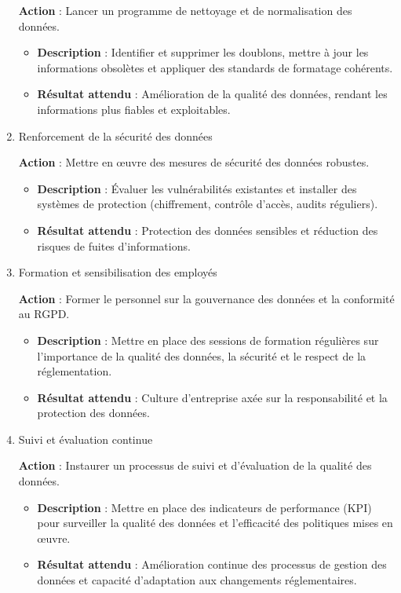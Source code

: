 \begin{enumerate}
        \textbf{Action} : Lancer un programme de nettoyage et de normalisation des données.

        \begin{itemize}
            \item \textbf{Description} : Identifier et supprimer les doublons, mettre à jour les informations obsolètes et appliquer des standards de formatage cohérents.
            \item \textbf{Résultat attendu} : Amélioration de la qualité des données, rendant les informations plus fiables et exploitables.
        \end{itemize}

    \item Renforcement de la sécurité des données

        \textbf{Action} : Mettre en œuvre des mesures de sécurité des données robustes.

        \begin{itemize}
            \item \textbf{Description} : Évaluer les vulnérabilités existantes et installer des systèmes de protection (chiffrement, contrôle d'accès, audits réguliers).
            \item \textbf{Résultat attendu} : Protection des données sensibles et réduction des risques de fuites d’informations.
        \end{itemize}

    \item Formation et sensibilisation des employés

        \textbf{Action} : Former le personnel sur la gouvernance des données et la conformité au RGPD.

        \begin{itemize}
            \item \textbf{Description} : Mettre en place des sessions de formation régulières sur l'importance de la qualité des données, la sécurité et le respect de la réglementation.
            \item \textbf{Résultat attendu} : Culture d'entreprise axée sur la responsabilité et la protection des données.
        \end{itemize}

    \item Suivi et évaluation continue

        \textbf{Action} : Instaurer un processus de suivi et d'évaluation de la qualité des données.

        \begin{itemize}
            \item \textbf{Description} : Mettre en place des indicateurs de performance (KPI) pour surveiller la qualité des données et l’efficacité des politiques mises en œuvre.
            \item \textbf{Résultat attendu} : Amélioration continue des processus de gestion des données et capacité d’adaptation aux changements réglementaires.
        \end{itemize}


\end{enumerate}
